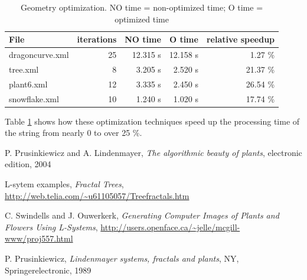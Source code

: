 \documentclass[11pt,a4paper]{article}
\begin{document}
\begin{table}
\center
\begin{tabular}{l r r r r}
File 			& iterations	& NO time	& O time	& relative speedup\\ \hline
dragoncurve.xml	& 25			& 12.315 s	& 12.158 s	&  1.27 \% \\ \hline
tree.xml		& 8				&  3.205 s	&  2.520 s	& 21.37 \% \\ \hline
plant6.xml		& 12			&  3.335 s	&  2.450 s	& 26.54 \% \\ \hline
snowflake.xml	& 10			&  1.240 s	&  1.020 s	& 17.74 \% \\ \hline

\end{tabular}
\caption{Geometry optimization. NO time = non-optimized time; O time = optimized time} \label{benchopt}
\end{table}

Table \ref{benchopt} shows how these optimization techniques speed up the processing time of the string from nearly 0 to over 25 \%.

\newpage
\begin{thebibliography}{9}

P. Prusinkiewicz and A. Lindenmayer,
\emph{The algorithmic beauty of plants},
electronic edition, 2004

L-sytem examples,
\emph{Fractal Trees},
\url{http://web.telia.com/~u61105057/Treefractals.htm}

 C. Swindells and J. Ouwerkerk,
\emph{Generating Computer Images of Plants and Flowers Using L-Systems},
\url{http://users.openface.ca/~jelle/mcgill-www/proj557.html}

P. Prusinkiewicz,
\emph{Lindenmayer systems, fractals and plants},
NY, Springerelectronic, 1989

\end{thebibliography}
\end{document}
